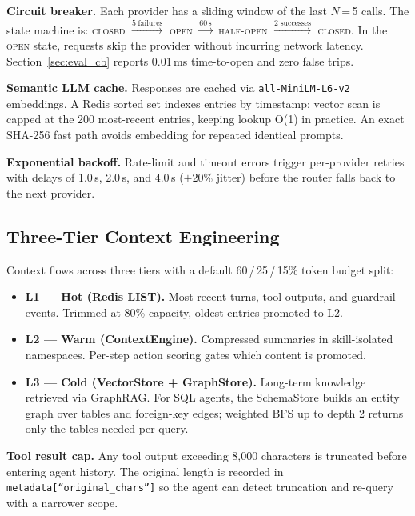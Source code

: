 \documentclass[conference]{IEEEtran}
\begin{document}
\textbf{Circuit breaker.} Each provider has a sliding window of the
last $N$\,=\,5 calls. The state machine is:
\textsc{closed} $\xrightarrow{5\;\text{failures}}$ \textsc{open}
$\xrightarrow{60\,\text{s}}$ \textsc{half-open}
$\xrightarrow{2\;\text{successes}}$ \textsc{closed}.
In the \textsc{open} state, requests skip the provider without incurring
network latency. Section~\ref{sec:eval_cb} reports 0.01\,ms
time-to-open and zero false trips.

\textbf{Semantic LLM cache.} Responses are cached via
\texttt{all-MiniLM-L6-v2}~\cite{minilm} embeddings. A Redis sorted set
indexes entries by timestamp; vector scan is capped at the 200
most-recent entries, keeping lookup O(1) in practice. An exact
SHA-256 fast path avoids embedding for repeated identical prompts.

\textbf{Exponential backoff.} Rate-limit and timeout errors trigger
per-provider retries with delays of 1.0\,s, 2.0\,s, and 4.0\,s
($\pm$20\% jitter) before the router falls back to the next provider.

\subsection{Three-Tier Context Engineering}
\label{sec:context}

Context flows across three tiers with a default 60\,/\,25\,/\,15\%
token budget split:

\begin{itemize}[noitemsep]
  \item \textbf{L1 — Hot (Redis LIST).} Most recent turns, tool outputs,
    and guardrail events. Trimmed at 80\% capacity, oldest entries
    promoted to L2.
  \item \textbf{L2 — Warm (ContextEngine).} Compressed summaries in
    skill-isolated namespaces. Per-step action scoring gates which
    content is promoted.
  \item \textbf{L3 — Cold (VectorStore + GraphStore).} Long-term
    knowledge retrieved via GraphRAG. For SQL agents, the SchemaStore
    builds an entity graph over tables and foreign-key edges; weighted
    BFS up to depth 2 returns only the tables needed per query.
\end{itemize}

\textbf{Tool result cap.} Any tool output exceeding 8,000 characters is
truncated before entering agent history. The original length is recorded
in \texttt{metadata[``original\_chars'']} so the agent can detect
truncation and re-query with a narrower scope.
\end{document}
